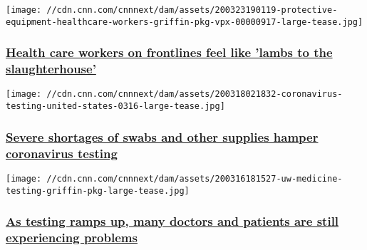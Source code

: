 \href{/2020/03/23/us/coronavirus-healthcare-supply-shortage-workers-at-risk-invs/index.html}{}

\texttt{[image: //cdn.cnn.com/cnnnext/dam/assets/200323190119-protective-equipment-healthcare-workers-griffin-pkg-vpx-00000917-large-tease.jpg]}

\hypertarget{health-care-workers-on-frontlines-feel-like-lambs-to-the-slaughterhouse}{%
\subsubsection{\texorpdfstring{\href{/2020/03/23/us/coronavirus-healthcare-supply-shortage-workers-at-risk-invs/index.html}{Health
care workers on frontlines feel like 'lambs to the
slaughterhouse'}}{Health care workers on frontlines feel like 'lambs to the slaughterhouse'}}\label{health-care-workers-on-frontlines-feel-like-lambs-to-the-slaughterhouse}}

\href{/2020/03/18/us/coronovirus-testing-supply-shortages-invs/index.html}{}

\texttt{[image: //cdn.cnn.com/cnnnext/dam/assets/200318021832-coronavirus-testing-united-states-0316-large-tease.jpg]}

\hypertarget{severe-shortages-of-swabs-and-other-supplies-hamper-coronavirus-testing-}{%
\subsubsection{\texorpdfstring{\href{/2020/03/18/us/coronovirus-testing-supply-shortages-invs/index.html}{Severe
shortages of swabs and other supplies hamper coronavirus testing
}}{Severe shortages of swabs and other supplies hamper coronavirus testing }}\label{severe-shortages-of-swabs-and-other-supplies-hamper-coronavirus-testing-}}

\href{/2020/03/16/us/coronavirus-testing-problems-linger-invs/index.html}{}

\texttt{[image: //cdn.cnn.com/cnnnext/dam/assets/200316181527-uw-medicine-testing-griffin-pkg-large-tease.jpg]}

\hypertarget{as-testing-ramps-up-many-doctors-and-patients-are-still-experiencing-problems}{%
\subsubsection{\texorpdfstring{\href{/2020/03/16/us/coronavirus-testing-problems-linger-invs/index.html}{As
testing ramps up, many doctors and patients are still experiencing
problems}}{As testing ramps up, many doctors and patients are still experiencing problems}}\label{as-testing-ramps-up-many-doctors-and-patients-are-still-experiencing-problems}}

